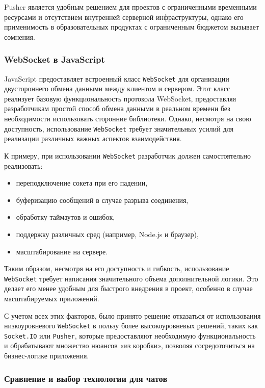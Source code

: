 Pusher является удобным решением для проектов с ограниченными временными ресурсами и отсутствием внутренней серверной инфраструктуры, однако его применимость в образовательных продуктах с ограниченным бюджетом вызывает сомнения.

\subsubsection{WebSocket в JavaScript}

JavaScript предоставляет встроенный класс \texttt{WebSocket} для организации двустороннего обмена данными между клиентом и сервером. Этот класс реализует базовую функциональность протокола WebSocket, предоставляя разработчикам простой способ обмена данными в реальном времени без необходимости использовать сторонние библиотеки. Однако, несмотря на свою доступность, использование \texttt{WebSocket} требует значительных усилий для реализации различных важных аспектов взаимодействия.

К примеру, при использовании \texttt{WebSocket} разработчик должен самостоятельно реализовать:
\begin{itemize}
    \item переподключение сокета при его падении,
    \item буферизацию сообщений в случае разрыва соединения,
    \item обработку таймаутов и ошибок,
    \item поддержку различных сред (например, Node.js и браузер),
    \item масштабирование на сервере.
\end{itemize}

Таким образом, несмотря на его доступность и гибкость, использование \texttt{WebSocket} требует написания значительного объема дополнительной логики. Это делает его менее удобным для быстрого внедрения в проект, особенно в случае масштабируемых приложений.

С учетом всех этих факторов, было принято решение отказаться от использования низкоуровневого \texttt{WebSocket} в пользу более высокоуровневых решений, таких как \texttt{Socket.IO} или \texttt{Pusher}, которые предоставляют необходимую функциональность и обрабатывают множество нюансов «из коробки», позволяя сосредоточиться на бизнес-логике приложения.

\subsubsection{Сравнение и выбор технологии для чатов}

